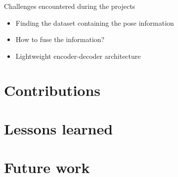 	Challenges encountered during the projects
	
	\begin{itemize}
		\item Finding the dataset containing the pose information
		\item How to fuse the information?
		\item Lightweight encoder-decoder architecture
	\end{itemize}
	
    \section{Contributions}
	
    \section{Lessons learned}

    \section{Future work}
    

